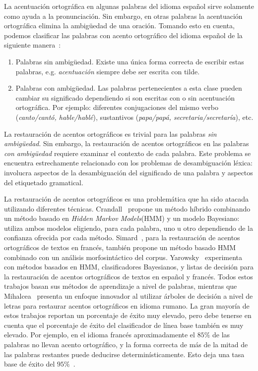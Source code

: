 \documentclass[runningheads,a4paper]{llncs}
\begin{document}
La acentuación ortográfica en algunas palabras del idioma español sirve solamente como ayuda a la pronunciación. Sin embargo, en otras palabras la acentuación ortográfica elimina la ambigüedad de una oración. Tomando esto en cuenta, podemos clasificar las palabras con acento ortográfico del idioma español de la siguiente manera~\cite{CRANDALL95}:
\begin{enumerate}
\item{Palabras sin ambigüedad}. Existe una única forma correcta de escribir estas palabras, e.g. \emph{acentuación} siempre debe ser escrita con tilde.
\item{Palabras con ambigüedad}. Las palabras pertenecientes a esta clase pueden cambiar su significado dependiendo si son escritas con o sin acentuación ortográfica. Por ejemplo: diferentes conjugaciones del mismo verbo (\emph{canto/cantó, hable/hablé}), sustantivos (\emph{papa/papá, secretaria/secretaría}), etc.
\end{enumerate}

La restauración de acentos ortográficos es trivial para las palabras \emph{sin ambig\"uedad}. Sin embargo, la restauración de acentos ortográficos en las palabras \emph{con ambig\"uedad} requiere examinar el contexto de cada palabra. Este problema se encuentra estrechamente relacionado con los problemas de desambiguación léxica: involucra aspectos de la desambiguación del significado de una palabra y aspectos del etiquetado gramatical. 

La restauración de acentos ortográficos es una problemática que ha sido atacada utilizando diferentes técnicas. Crandall~\cite{CRANDALL95} propone un método híbrido combinando un método basado en \emph{Hidden Markov Models}(HMM) y un modelo Bayesiano: utiliza ambos modelos eligiendo, para cada palabra, uno u otro dependiendo de la confianza ofrecida por cada método. Simard~\cite{SIMARD98}, para la restauración de acentos ortográficos de textos en francés, también propone un método basado HMM combinado con un análisis morfosintáctico del corpus. Yarowsky~\cite{YAROWSKY94,YAROWSKY94-2} experimenta con métodos basados en HMM, clasificadores Bayesianos, y listas de decisión para la restauración de acentos ortográficos de textos en español y francés. Todos estos trabajos basan sus métodos de aprendizaje a nivel de palabras, mientras que Mihalcea~\cite{MIHALCEA02} presenta un enfoque innovador al utilizar árboles de decisión a nivel de letras para restaurar acentos ortográficos en idioma rumano. La gran mayoría de estos trabajos reportan un porcentaje de éxito muy elevado, pero debe tenerse en cuenta que el porcentaje de éxito del clasificador de línea base también es muy elevado. Por ejemplo, en el idioma francés aproximadamente el $85\%$ de las palabras no llevan acento ortográfico, y la forma correcta de más de la mitad de las palabras restantes puede deducirse determinísticamente. Esto deja una tasa base de éxito del $95\%$~\cite{SIMARD98}.
\end{document}
